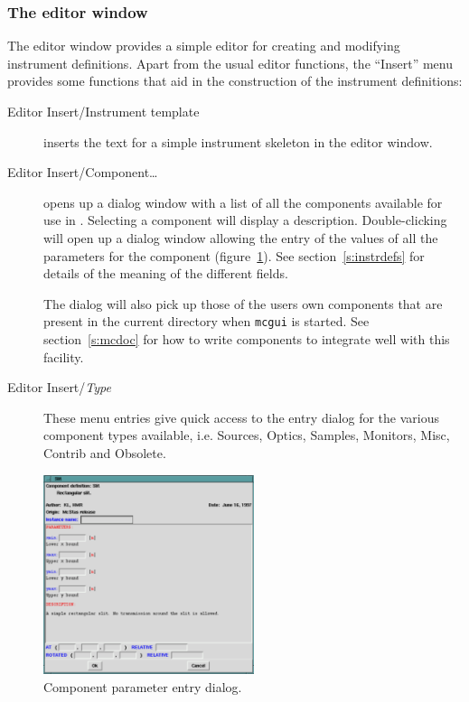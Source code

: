 \subsubsection{The editor window}

The editor window provides a simple editor for creating and modifying instrument
definitions. Apart from the usual editor functions, the ``Insert'' menu provides
some functions that aid in the construction of the instrument definitions:
\begin{description}
\item[Editor Insert/Instrument template] inserts the text for a simple instrument
  skeleton in the editor window.
\item[Editor Insert/Component\ldots] opens up a dialog window with a list of all
  the components available for use in \MCS. Selecting a component will
  display a description. Double-clicking will open up a dialog window
  allowing the entry of the values of all the parameters for the
  component (figure~\ref{f:comp_dialog}). See section~\ref{s:instrdefs}
  for details of the meaning of the different fields.

  The dialog will also pick up those of the users own components that are
  present in the current directory when \verb+mcgui+ is started. See
  section~\ref{s:mcdoc} for how to write components to integrate well with this
  facility.
\item[Editor Insert/\textit{Type}] These menu entries give quick access to the
  entry dialog for the various component types available, i.e. Sources, Optics,
  Samples, Monitors, Misc, Contrib and Obsolete.
\end{description}
\begin{figure}[tbp]
  \begin{center}
    \includegraphics[width=0.55\textwidth]{figures/comp_dialog}
    \caption{Component parameter entry dialog.}
    \label{f:comp_dialog}
  \end{center}
\end{figure}


